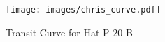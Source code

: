 \begin{figure}[ht]
    \centering
    \texttt{[image: images/chris\_curve.pdf]}
    \caption{Transit Curve for Hat P 20 B}
    \label{fig:hatp20_curve}
\end{figure}